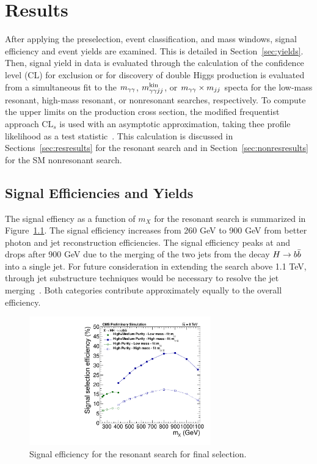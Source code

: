 \chapter{Results\label{ch:results}}

After applying the preselection, event classification, and mass windows, signal efficiency
and event yields are examined. This is detailed in Section~\ref{sec:yields}. Then, signal yield
in data is evaluated through the calculation of the confidence level (CL)
for exclusion or for discovery of double Higgs production is evaluated from a simultaneous fit
to the $m_{\gamma\gamma}$, $m_{\gamma\gamma jj}^{\rm kin}$, or $m_{\gamma\gamma} \times m_{jj}$ specta for the low-mass resonant, high-mass resonant,
or nonresonant searches, respectively.
To compute the upper limits on the production cross section, the modified frequentist approach
$\text{CL}_s$ is used with an asymptotic approximation, taking thee profile likelihood as a test
statistic~\cite{CLS1,CLS2}. This calculation is discussed in Sections~\ref{sec:resresults} for the
resonant search and in Section~\ref{sec:nonresresults} for the SM nonresonant search.

\section{Signal Efficiencies and Yields\label{sec:yields}}

The signal effiency as a function of $m_X$ for the resonant search is summarized in
Figure~\ref{fig:eff_res}. The signal efficiency increases from 260 GeV to 900 GeV
from better photon and jet reconstruction efficiencies. The signal efficiency
peaks at and drops after 900 GeV due to the merging of the two jets from the decay $H\to b\bar{b}$ into
a single jet. For future consideration in extending the search above 1.1 TeV,
through jet substructure techniques would be necessary to resolve the jet merging~\cite{Ellis:2009su}.
Both categories contribute approximately equally to the overall efficiency.

\begin{figure}[ht]
 \begin{center}
    \includegraphics[width=0.70\textwidth]{figures/results/eff_all.pdf}
      \end{center}
\caption{Signal efficiency for the resonant search for final selection.}
\label{fig:eff_res}
\end{figure}

